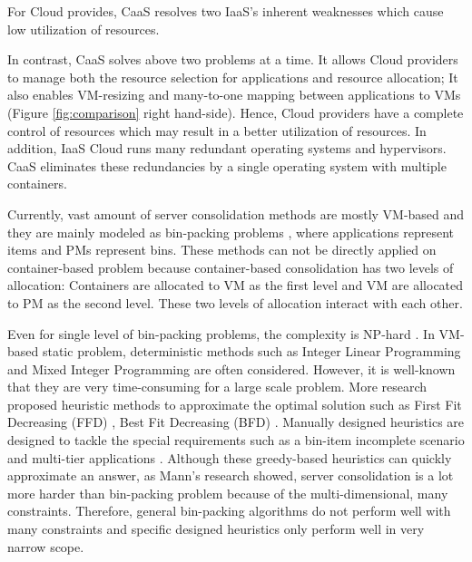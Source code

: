 For Cloud provides, CaaS resolves two IaaS's inherent weaknesses which cause low utilization of resources.



In contrast, CaaS solves above two problems at a time. It allows Cloud providers to manage both the resource selection for applications and resource allocation; It also enables VM-resizing and many-to-one mapping between applications to VMs (Figure \ref{fig:comparison} right hand-side).
Hence, Cloud providers have a complete control of resources which may result in a better utilization of resources. 
In addition, IaaS Cloud runs many redundant operating systems and hypervisors. CaaS eliminates these redundancies by a single operating system with multiple containers.

\vspace{10mm}

Currently, vast amount of server consolidation methods are mostly VM-based and they are mainly modeled as bin-packing problems \cite{Mann:2015ua}, where applications represent items and PMs represent bins. These methods can not be directly applied on container-based problem because container-based consolidation has two levels of allocation: Containers are allocated to VM as the first level and VM are allocated to PM as the second level. These two levels of allocation interact with each other. 

Even for single level of bin-packing problems, the complexity is NP-hard .
In VM-based static problem, deterministic methods such as  
Integer Linear Programming \cite{Speitkamp:2010ck} and Mixed
Integer Programming \cite{Wang:2016eh} are often considered. However, it is well-known that they are very time-consuming for a large scale problem. More research proposed heuristic methods
 to approximate the optimal solution such as 
First Fit Decreasing (FFD) \cite{Panigrahy:2011wk}, Best Fit Decreasing (BFD) \cite{Beloglazov:2012ji}.
Manually designed heuristics are designed to tackle the special requirements such 
as a bin-item incomplete scenario \cite{Gupta:2008ul} and multi-tier applications \cite{Jung:2008vb, Li:2009wf}. Although these greedy-based heuristics can quickly approximate an answer,  as Mann's research \cite{Mann:2015ua} showed, server consolidation is a lot more harder than bin-packing problem because of the multi-dimensional, many constraints. Therefore, general bin-packing algorithms do not perform well with many constraints and specific designed heuristics only perform well in very narrow scope.

